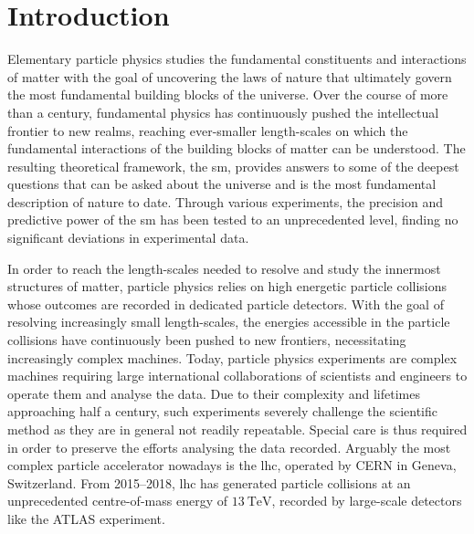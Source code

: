 
\chapter*{Introduction}
\ifpdf
    \graphicspath{{Chapter1/Figs/Raster/}{Chapter1/Figs/PDF/}{Chapter1/Figs/}}
\else
    \graphicspath{{Chapter1/Figs/Vector/}{Chapter1/Figs/}}
\fi

Elementary particle physics studies the fundamental constituents and interactions of matter with the goal of uncovering the laws of nature that ultimately govern the most fundamental building blocks of the universe. Over the course of more than a century, fundamental physics has continuously pushed the intellectual frontier to new realms, reaching ever-smaller length-scales on which the fundamental interactions of the building blocks of matter can be understood. The resulting theoretical framework, the \gls{sm}, provides answers to some of the deepest questions that can be asked about the universe and is the most fundamental description of nature to date. Through various experiments, the precision and predictive power of the \gls{sm} has been tested to an unprecedented level, finding no significant deviations in experimental data.

In order to reach the length-scales needed to resolve and study the innermost structures of matter, particle physics relies on high energetic particle collisions whose outcomes are recorded in dedicated particle detectors. With the goal of resolving increasingly small length-scales, the energies accessible in the particle collisions have continuously been pushed to new frontiers, necessitating increasingly complex machines. Today, particle physics experiments are complex machines requiring large international collaborations of scientists and engineers to operate them and analyse the data. Due to their complexity and lifetimes approaching half a century, such experiments severely challenge the scientific method as they are in general not readily repeatable. Special care is thus required in order to preserve the efforts analysing the data recorded. Arguably the most complex particle accelerator nowadays is the \gls{lhc}, operated by CERN in Geneva, Switzerland. From 2015--2018, \gls{lhc} has generated particle collisions at an unprecedented centre-of-mass energy of $\SI{13}{\TeV}$, recorded by large-scale detectors like the ATLAS experiment.

